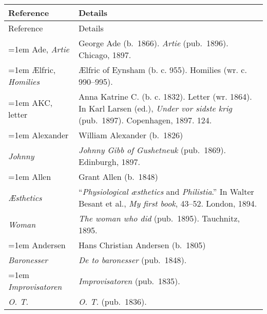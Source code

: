 \noindent\begin{xltabular}{\textwidth}{ lQ }
\lsptoprule
Reference & Details \\
\midrule
\endfirsthead
\midrule
Reference & Details \\
\midrule
\endhead
\lspbottomrule\endlastfoot

\hangindent=1em  Ade, \textit{Artie} & George Ade (b.~1866). \textit{Artie} (pub.~1896). Chicago, 1897. \\

\hangindent=1em  Ælfric, \textit{Homilies} & Ælfric of Eynsham (b. c. 955). Homilies (wr. c. 990--995). \\

\hangindent=1em  AKC, letter & Anna Katrine C. (b. c. 1832). Letter (wr. 1864). In Karl Larsen (ed.), \textit{Under vor sidste krig} (pub.~1897). Copenhagen, 1897. 124.\\

\hangindent=1em  Alexander  & William Alexander (b.~1826)\\
\hspace{1em}\textit{Johnny} & \textit{Johnny Gibb of Gushet\-neuk} (pub.~1869). Edinburgh, 1897. \\

\hangindent=1em  Allen & Grant Allen (b.~1848) \\
\hspace{1em}\textit{Æsthetics} & ``\textit{Physiological æsthetics} and \textit{Philistia}.'' In Walter Besant et al., \textit{My first book}, 43--52. London, 1894. \\
\hspace{1em}\textit{Woman} & \textit{The woman who did} (pub.~1895). Tauchnitz, 1895. \\

\hangindent=1em  Andersen & Hans Christian Andersen (b.~1805) \\
\hspace{1em}\textit{Baronesser} & \textit{De to baronesser} (pub.~1848). \\
\hspace{1em}\hangindent=1em  \textit{Improvisa\-toren} & \textit{Improvisatoren} (pub.~1835). \\ %
\hspace{1em}\textit{O. T.} & \textit{O. T.} (pub.~1836). \\ %


\end{xltabular}

